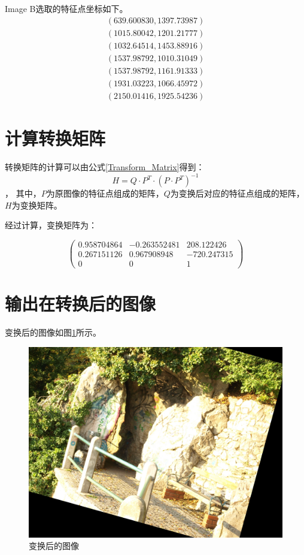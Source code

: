 \documentclass[UTF8]{ctexart}
\begin{document}
Image B选取的特征点坐标如下。
\[ \begin{array}{cc}
	\left(639.600830, 1397.73987\right) \\
	\left(1015.80042, 1201.21777\right) \\
	\left(1032.64514, 1453.88916\right) \\
	\left(1537.98792, 1010.31049\right) \\
	\left(1537.98792, 1161.91333\right) \\
	\left(1931.03223, 1066.45972\right) \\
	\left(2150.01416, 1925.54236\right) 
\end{array} \]

\section{计算转换矩阵}

转换矩阵的计算可以由公式\ref{Transform_Matrix}得到：
\begin{equation}
	\label{Transform_Matrix}
	H = Q \cdot P^T \cdot (P \cdot P^T )^{-1}
\end{equation}，
其中，$P$为原图像的特征点组成的矩阵，$Q$为变换后对应的特征点组成的矩阵，$H$为变换矩阵。

经过计算，变换矩阵为：

\[\left( \begin{array}{ccc}
	0.958704864 & -0.263552481 & 208.122426  \\
	0.267151126 & 0.967908948 & -720.247315 \\
	0 & 0 & 1 
	\end{array} \right)\]

\section{输出在转换后的图像}

变换后的图像如图\ref{after_transform}所示。

\begin{figure}[h!]
	\centering
	\includegraphics[width=0.65\linewidth]{test.jpg}
	\caption{变换后的图像}
	\label{after_transform}
\end{figure}
\end{document}
